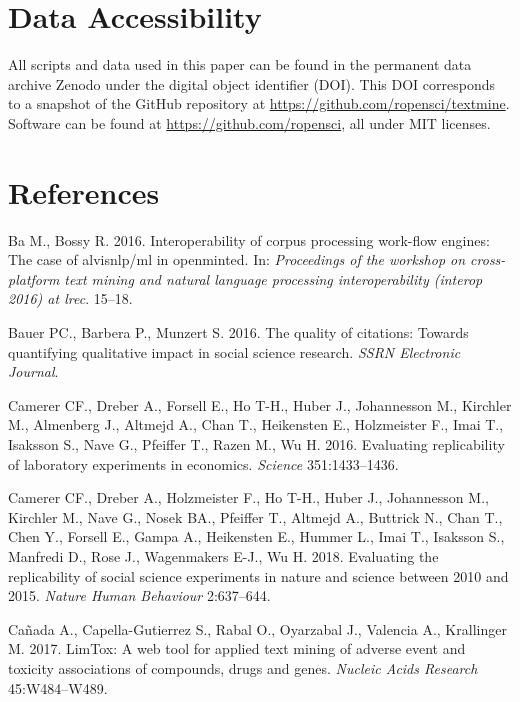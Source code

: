 \documentclass[author-year, review, 11pt]{components/elsarticle} %
\begin{document}
\hypertarget{data-accessibility}{%
\section{Data Accessibility}\label{data-accessibility}}

All scripts and data used in this paper can be found in the permanent
data archive Zenodo under the digital object identifier (DOI). This DOI
corresponds to a snapshot of the GitHub repository at
\url{https://github.com/ropensci/textmine}. Software can be found at
\url{https://github.com/ropensci}, all under MIT licenses.

\hypertarget{references}{%
\section*{References}\label{references}}

\hypertarget{refs}{}
\leavevmode\hypertarget{ref-ba2016interoperability}{}%
Ba M., Bossy R. 2016. Interoperability of corpus processing work-flow
engines: The case of alvisnlp/ml in openminted. In: \emph{Proceedings of
the workshop on cross-platform text mining and natural language
processing interoperability (interop 2016) at lrec}. 15--18.

\leavevmode\hypertarget{ref-Bauer2016}{}%
Bauer PC., Barbera P., Munzert S. 2016. The quality of citations:
Towards quantifying qualitative impact in social science research.
\emph{SSRN Electronic Journal}.

\leavevmode\hypertarget{ref-Camerer2016}{}%
Camerer CF., Dreber A., Forsell E., Ho T-H., Huber J., Johannesson M.,
Kirchler M., Almenberg J., Altmejd A., Chan T., Heikensten E.,
Holzmeister F., Imai T., Isaksson S., Nave G., Pfeiffer T., Razen M., Wu
H. 2016. Evaluating replicability of laboratory experiments in
economics. \emph{Science} 351:1433--1436.

\leavevmode\hypertarget{ref-Camerer2018}{}%
Camerer CF., Dreber A., Holzmeister F., Ho T-H., Huber J., Johannesson
M., Kirchler M., Nave G., Nosek BA., Pfeiffer T., Altmejd A., Buttrick
N., Chan T., Chen Y., Forsell E., Gampa A., Heikensten E., Hummer L.,
Imai T., Isaksson S., Manfredi D., Rose J., Wagenmakers E-J., Wu H.
2018. Evaluating the replicability of social science experiments in
nature and science between 2010 and 2015. \emph{Nature Human Behaviour}
2:637--644.

\leavevmode\hypertarget{ref-Canada2017}{}%
Cañada A., Capella-Gutierrez S., Rabal O., Oyarzabal J., Valencia A.,
Krallinger M. 2017. LimTox: A web tool for applied text mining of
adverse event and toxicity associations of compounds, drugs and genes.
\emph{Nucleic Acids Research} 45:W484--W489.
\end{document}
